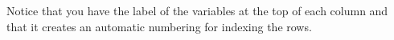 
Notice that you have the label of the variables at the top of each column and that it creates an automatic numbering for indexing the rows.  








